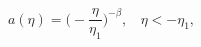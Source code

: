 \begin{equation}
a(\eta) = \biggl( -  \frac{\eta}{\eta_1}\biggr)^{-\beta}, ~~~~\eta<-\eta_{1},
\label{dS}
\end{equation}

